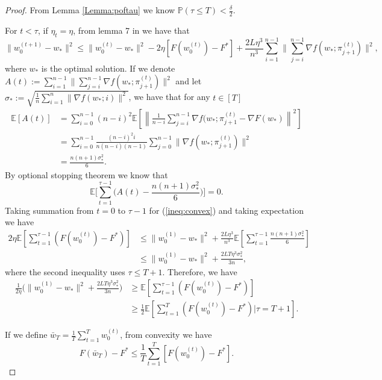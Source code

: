 \documentclass{article} %
\theoremstyle{plain}
\theoremstyle{definition}
\theoremstyle{remark}
\begin{document}
\begin{proof}

From Lemma \ref{Lemma:poftau} we know $\mathbb{P}(\tau\leq T)<\frac{\delta}{2}.$

    For $t<\tau$, if $\eta_t=\eta$, from lemma 7 in \citep{nguyen2021unified} we have that
    \begin{equation}
    \label{ineq:convex}
        \|w^{(t+1)}_0-w_*\|^2\leq \|w^{(t)}_0-w_*\|^2-2\eta[F(w^{(t)}_0)-F^*]+\frac{2L\eta^3}{n^3}\sum_{i=1}^{n-1}\|\sum_{j=i}^{n-1} \nabla f(w_*;\pi^{(t)}_{j+1})\|^2,
    \end{equation}
    where $w_*$ is the optimal solution. If we denote $A(t):=\sum_{i=1}^{n-1}\|\sum_{j=i}^{n-1} \nabla f(w_*;\pi^{(t)}_{j+1})\|^2$ and let $\sigma_*:=\sqrt{\frac{1}{n}\sum_{i=1}^n\|\nabla f(w_*;i)\|^2}$, we have that for any $t\in[T]$
    \begin{align*}
    \mathbb{E}[A(t)]&=\sum_{i=0}^{n-1}(n-i)^2\mathbb{E}\left[\left\|\frac{1}{n-i}\sum_{j=i}^{n-1}\nabla f(w_*;\pi^{(t)}_{j+1}-\nabla F(w_*)\right\|^2\right] \\
    & = \sum_{i=0}^{n-1}\frac{(n-i)^2i}{n(n-i)(n-1)}\sum_{j=0}^{n-1}\|\nabla f(w_*;\pi^{(t)}_{j+1})\|^2\\
    & = \frac{n(n+1)\sigma_*^2}{6}.
    \end{align*}
    By optional stopping theorem we know that 
    $$\mathbb{E}\Big[\sum_{t=1}^{\tau-1}\Big(A(t)-\frac{n(n+1)\sigma_*^2}{6}\Big)\Big]=0.$$
    Taking summation from $t=0$ to $\tau-1$ for (\ref{ineq:convex}) and taking expectation we have
    \begin{align*}
        2\eta\mathbb{E}[\sum_{t=1}^{\tau-1}(F(w^{(t)}_0)-F^*)] &\leq \|w^{(1)}_0-w_*\|^2+\frac{2L\eta^3}{n^3}\mathbb{E}[\sum_{t=1}^{\tau-1}\frac{n(n+1)\sigma_*^2}{6}]\\
        &\leq \|w^{(1)}_0-w_*\|^2+\frac{2LT\eta^3\sigma_*^2}{3n},
    \end{align*}
    where the second inequality uses $\tau\leq T+1.$ Therefore, we have
    \begin{align*}
        \frac{1}{2\eta}\Big(\|w^{(1)}_0-w_*\|^2+\frac{2LT\eta^3\sigma_*^2}{3n}\Big)&\geq \mathbb{E}[\sum_{t=1}^{\tau-1}(F(w^{(t)}_0)-F^*)]\\
        &\geq \frac{1}{2}\mathbb{E}[\sum_{t=1}^{T}(F(w^{(t)}_0)-F^*)|\tau=T+1].
    \end{align*}
    
    If we define $\bar{w}_{T}=\frac{1}{T}\sum_{t=1}^{T}w^{(t)}_0$, from convexity we have 
    $$F(\bar{w}_T)-F^*\leq \frac{1}{T}\sum_{t=1}^T [F(w^{(t)}_0)-F^*].$$


\end{proof}
\end{document}

